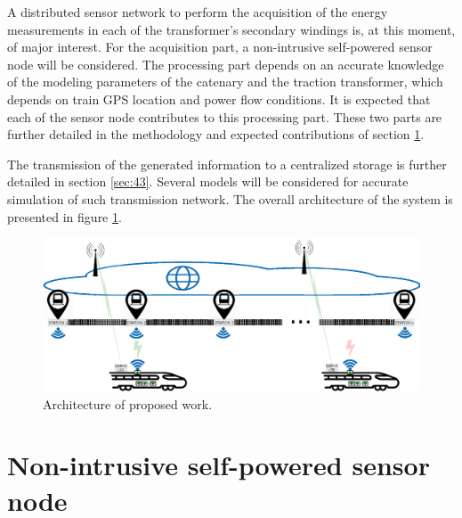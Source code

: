 A distributed sensor network to perform the acquisition of the energy measurements in each of the transformer's secondary windings is, at this moment, of major interest.
For the acquisition part, a non-intrusive self-powered sensor node will be considered.
The processing part depends on an accurate knowledge of the modeling parameters of the catenary and the traction transformer, which depends on train GPS location and power flow conditions. 
It is expected that each of the sensor node contributes to this processing part.
These two parts are further detailed in the methodology and expected contributions of section \ref{sec:42}.



The transmission of the generated information to a centralized storage is further detailed in section \ref{sec:43}. Several models will be considered for accurate simulation of such transmission network. The overall architecture of the system is presented in figure \ref{fig:41architecture}.

\begin{figure}[h!]
	\centering
	\includegraphics[width=1.0\textwidth,keepaspectratio]{figures/40.Method/architecture}
	\caption{Architecture of proposed work.}
	\label{fig:41architecture}
\end{figure}







\section{Non-intrusive self-powered sensor node}
\label{sec:42}
